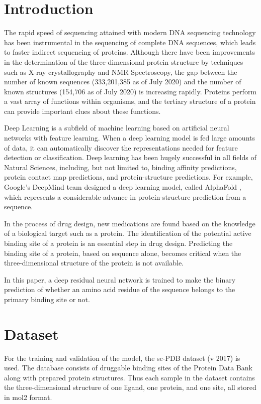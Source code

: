 \documentclass[journal=jacsat,manuscript=article]{achemso}
\begin{document}
\section{Introduction}
\quad The rapid speed of sequencing attained with modern DNA sequencing technology has been instrumental in the sequencing of complete DNA sequences, which leads to faster indirect sequencing of proteins. Although there have been improvements in the determination of the three-dimensional protein structure by techniques such as X-ray crystallography and NMR Spectroscopy, the gap between the number of known sequences (333,201,385 as of July 2020) and the number of known structures (154,706 as of July 2020) is increasing rapidly. Proteins perform a vast array of functions within organisms, and the tertiary structure of a protein can provide important clues about these functions.

Deep Learning is a subfield of machine learning based on artificial neural networks with feature learning. When a deep learning model is fed large amounts of data, it can automatically discover the representations needed for feature detection or classification. Deep learning has been hugely successful in all fields of Natural Sciences, including, but not limited to, binding affinity predictions, protein contact map predictions, and protein-structure predictions. For example, Google's DeepMind team designed a deep learning model, called AlphaFold \cite{senior2020improved}, which represents a considerable advance in protein-structure prediction from a sequence.

In the process of drug design, new medications are found based on the knowledge of a biological target such as a protein. The identification of the potential active binding site of a protein is an essential step in drug design. Predicting the binding site of a protein, based on sequence alone, becomes critical when the three-dimensional structure of the protein is not available.

In this paper, a deep residual neural network is trained to make the binary prediction of whether an amino acid residue of the sequence belongs to the primary binding site or not.

\section{Dataset}
\quad For the training and validation of the model, the sc-PDB\cite{desaphy2015sc} dataset (v 2017) is used. The database consists of druggable binding sites of the Protein Data Bank along with prepared protein structures. Thus each sample in the dataset contains the three-dimensional structure of one ligand, one protein, and one site, all stored in mol2 format.
\end{document}
